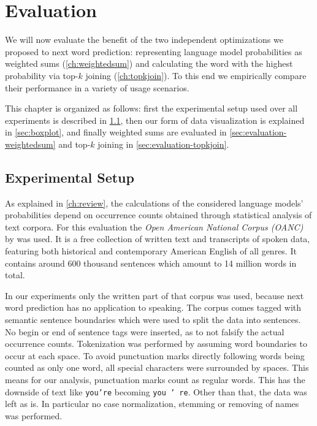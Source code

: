\chapter{Evaluation}
\label{ch:evaluation}

We will now evaluate the benefit of the two independent optimizations we
proposed to next word prediction: representing language model probabilities as
weighted sums (\cref{ch:weightedsum}) and calculating the word with the highest
probability via top-$k$ joining (\cref{ch:topkjoin}).
To this end we empirically compare their performance in a variety of usage
scenarios.

This chapter is organized as follows:
first the experimental setup used over all experiments is described in
\cref{sec:experimental-setup}, then our form of data visualization is explained
in \cref{sec:boxplot}, and finally weighted sums are evaluated in
\cref{sec:evaluation-weightedsum} and top-$k$ joining in
\cref{sec:evaluation-topkjoin}.


\section{Experimental Setup}
\label{sec:experimental-setup}

As explained in \cref{ch:review}, the calculations of the considered language
models' probabilities depend on occurrence counts obtained through statistical
analysis of text corpora.
For this evaluation the \emph{Open American National Corpus (OANC)} by
\textcite{OANC} was used.
It is a free collection of written text and transcripts of spoken data,
featuring both historical and contemporary American English of all genres.
It contains around 600 thousand sentences which amount to 14 million words in
total.

In our experiments only the written part of that corpus was used, because next
word prediction has no application to speaking.
The corpus comes tagged with semantic sentence boundaries which were used to
split the data into sentences.
No begin or end of sentence tags were inserted, as to not falsify the actual
occurrence counts.
Tokenization was performed by assuming word boundaries to occur at each space.
To avoid punctuation marks directly following words being counted as only one
word, all special characters were surrounded by spaces.
This means for our analysis, punctuation marks count as regular words.
This has the downside of text like \texttt{you're} becoming \texttt{you ' re}.
Other than that, the data was left as is.
In particular no case normalization, stemming or removing of names was
performed.


